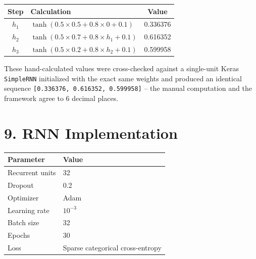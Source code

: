 \documentclass[10pt]{article}
\begin{document}
\begin{center}
\begin{tabular}{|c|l|c|}
\hline
Step & Calculation & Value\\
\hline
$h_1$ & $\tanh(0.5\times0.5+0.8\times0+0.1)$ & 0.336376\\
$h_2$ & $\tanh(0.5\times0.7+0.8\times h_1+0.1)$ & 0.616352\\
$h_3$ & $\tanh(0.5\times0.2+0.8\times h_2+0.1)$ & 0.599958\\
\hline
\end{tabular}
\end{center}

These hand-calculated values were cross-checked against a single-unit Keras
\texttt{SimpleRNN} initialized with the exact same weights and produced an
identical sequence \texttt{[0.336376, 0.616352, 0.599958]} -- the manual
computation and the framework agree to 6 decimal places.

\section*{9. RNN Implementation}

\begin{center}
\end{center}

\begin{center}
\begin{tabular}{|l|l|}
\hline
Parameter & Value\\
\hline
Recurrent units & 32\\
Dropout & 0.2\\
Optimizer & Adam\\
Learning rate & $10^{-3}$\\
Batch size & 32\\
Epochs & 30\\
Loss & Sparse categorical cross-entropy\\
\hline
\end{tabular}
\end{center}
\end{document}
